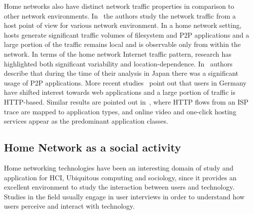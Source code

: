 Home networks also have distinct network traffic properties in comparison to
other network environments.  In~\cite{Reggani12} the authors study the network
traffic from a host point of view for various network environment.  In a home
network setting, hosts generate significant traffic volumes of filesystem and
P2P applications and a large portion of the traffic remains local and is observable
only from within the network.  In terms of the home network Internet traffic
pattern, research has highlighted both significant variability and location-dependence.
In~\cite{Cho2006} authors describe that during the time of their analysis in
Japan there was a significant usage of P2P applications. More recent
studies~\cite{Maier2009} point out that users in Germany have shifted interest
towards web applications and a large portion of traffic is HTTP-based. Similar
results are pointed out in~\cite{Erman2011}, where HTTP flows from an ISP trace
are mapped to application types, and online video and one-click hosting services
appear as the predominant application classes. 

\subsection{Home Network as a social activity} \label{s:home_social}

Home networking technologies have been an interesting domain of study and
application for HCI, Ubiquitous computing and sociology, since it provides an
excellent environment to study the interaction between users and technology.
Studies in the field usually engage in user interviews in order to understand
how users perceive and interact with technology. 

